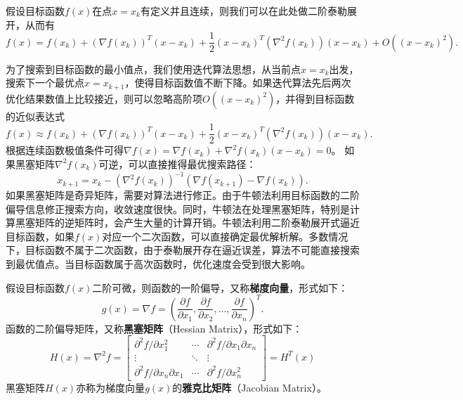 假设目标函数$f(x)$在点$x=x_k$有定义并且连续，则我们可以在此处做二阶泰勒展开，从而有
\[
    f(x) = f(x_k) + (\nabla f(x_k))^T (x - x_k) + \frac{1}{2} (x - x_k)^T (\nabla^2 f(x_k)) (x - x_k)  + O((x - x_k)^2).
\]

为了搜索到目标函数的最小值点，我们使用迭代算法思想，从当前点$x=x_k$出发，搜索下一个最优点$x=x_{k+1}$，使得目标函数值不断下降。如果迭代算法先后两次优化结果数值上比较接近，则可以忽略高阶项$O((x - x_k)^2)$，并得到目标函数的近似表达式
\begin{equation}
    f(x) \approx f(x_k) + (\nabla f(x_k))^T (x - x_k) + \frac{1}{2} (x - x_k)^T (\nabla^2 f(x_k)) (x - x_k).
\end{equation}
根据连续函数极值条件可得$\nabla f(x) = \nabla f(x_k) + \nabla^2 f(x_k) (x - x_k) = 0$。
如果黑塞矩阵$\nabla^2 f(x_k)$可逆，可以直接推得最优搜索路径：
\begin{equation}
    x_{k+1} = x_k - (\nabla^2 f(x_k))^{-1} (\nabla f(x_{k+1}) - \nabla f(x_k)).
\end{equation}
如果黑塞矩阵是奇异矩阵，需要对算法进行修正。由于牛顿法利用目标函数的二阶偏导信息修正搜索方向，收敛速度很快。同时，牛顿法在处理黑塞矩阵，特别是计算黑塞矩阵的逆矩阵时，会产生大量的计算开销。牛顿法利用二阶泰勒展开式逼近目标函数，如果$f(x)$对应一个二次函数，可以直接确定最优解析解。多数情况下，目标函数不属于二次函数，由于泰勒展开存在逼近误差，算法不可能直接搜索到最优值点。当目标函数属于高次函数时，优化速度会受到很大影响。

\begin{shaded}
\noindent 假设目标函数$f(x)$二阶可微，则函数的一阶偏导，又称\textbf{梯度向量}，形式如下：
\begin{equation}
g(x)=\nabla f=(\frac{\partial f}{\partial x_1},\frac{\partial f}{\partial x_2},\ldots, \frac{\partial f}{\partial x_n})^T.
\end{equation}
函数的二阶偏导矩阵，又称\textbf{黑塞矩阵}（Hessian Matrix），形式如下：
\begin{equation}\label{eq:hessianmatrix}
    H(x)=\nabla^2 f =
    \begin{bmatrix}
    \partial^2 f/\partial x_1^2 & \cdots & \partial^2 f/\partial x_1\partial x_n \\
    \vdots & \ddots & \vdots \\
    \partial^2 f/\partial x_n\partial x_1 & \cdots & \partial^2 f/\partial x_n^2
    \end{bmatrix}=H^T(x)
\end{equation}
黑塞矩阵$H(x)$亦称为梯度向量$g(x)$的\textbf{雅克比矩阵}（Jacobian Matrix）。
\end{shaded}


